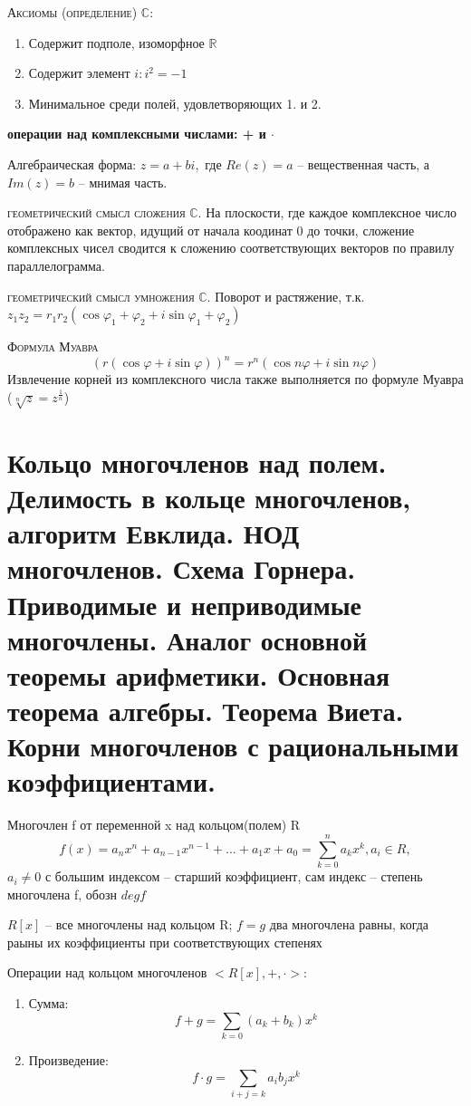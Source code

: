\documentclass{article}
\begin{document}
\textsc{Аксиомы (определение) $\mathbb{C}$:}
\begin{enumerate}
    \item Содержит подполе, изоморфное $\mathbb{R}$
    \item Содержит элемент $i: i^2=-1$
    \item Минимальное среди полей, удовлетворяющих 1. и 2.
\end{enumerate}

\textbf{операции над комплексными числами: + и $\cdot$}

Алгебраическая форма: $z=a+bi$, где $Re(z)=a$ – вещественная часть, а $Im(z)=b$ – мнимая часть.

\textsc{геометрический смысл сложения $\mathbb{C}$.}
На плоскости, где каждое комплексное число  отображено как вектор, идущий от начала коодинат 0 до точки, сложение комплексных чисел сводится к сложению соответствующих векторов по правилу параллелограмма.

\textsc{геометрический смысл умножения $\mathbb{C}$.}
Поворот и растяжение, т.к. $z_1z_2=r_1r_2(\cos{\varphi_1+\varphi_2}+i\sin{\varphi_1+\varphi_2})$

\textsc{Формула Муавра}
$$(r(\cos\varphi+i\sin\varphi))^n=r^n(\cos n\varphi+i\sin n\varphi)$$
Извлечение корней из комплексного числа также выполняется по формуле Муавра ($\sqrt[n]{z}=z^{\frac{1}{n}}$)

\section{Кольцо многочленов над полем. Делимость в кольце многочленов, алгоритм Евклида. НОД многочленов. Схема Горнера. Приводимые и неприводимые многочлены. Аналог основной теоремы арифметики. Основная теорема алгебры. Теорема Виета. Корни многочленов с рациональными коэффициентами.}
Многочлен f от переменной x над кольцом(полем) R
$$f(x)=a_nx^n+a_{n-1}x^{n-1}+\dots+a_1x+a_0=\sum^n_{k=0}a_kx^k, a_i\in R,$$
$a_i\neq 0$ с большим индексом – старший коэффициент, сам индекс – степень многочлена f, обозн $deg f$

$R[x]$ – все многочлены над кольцом R; $f=g$ два многочлена равны, когда раыны их коэффициенты при соответствующих степенях

Операции над кольцом многочленов $<R[x], +, \cdot>$:
\begin{enumerate}
    \item Сумма: $$f+g=\sum_{k=0}(a_k+b_k)x^k$$
    \item Произведение: $$f\cdot g=\sum_{i+j=k}a_ib_jx^k$$
\end{enumerate}
\end{document}
